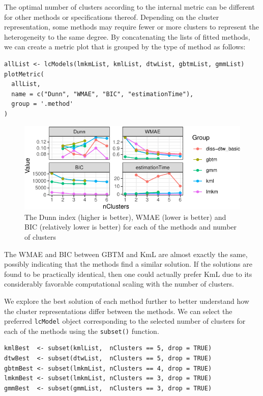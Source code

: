 The optimal number of clusters according to the internal metric can be different for other methods or specifications thereof. Depending on the cluster representation, some methods may require fewer or more clusters to represent the heterogeneity to the same degree. By concatenating the lists of fitted methods, we can create a metric plot that is grouped by the type of method as follows:

\begin{verbatim}
allList <- lcModels(lmkmList, kmlList, dtwList, gbtmList, gmmList)
plotMetric(
  allList,
  name = c("Dunn", "WMAE", "BIC", "estimationTime"),
  group = '.method'
)
\end{verbatim}

\begin{figure}

{\centering \includegraphics{figures/numclus-1} 

}

\caption{The Dunn index (higher is better), WMAE (lower is better) and BIC (relatively lower is better) for each of the methods and number of clusters}\label{fig:numclus}
\end{figure}

The WMAE and BIC between GBTM and KmL are almost exactly the same, possibly indicating that the methods find a similar solution. If the solutions are found to be practically identical, then one could actually prefer KmL due to its considerably favorable computational scaling with the number of clusters.

We explore the best solution of each method further to better understand how the cluster representations differ between the methods. We can select the preferred \texttt{lcModel} object corresponding to the selected number of clusters for each of the methods using the \texttt{subset()} function.

\begin{verbatim}
kmlBest  <- subset(kmlList,  nClusters == 5, drop = TRUE)
dtwBest  <- subset(dtwList,  nClusters == 5, drop = TRUE)
gbtmBest <- subset(lmkmList, nClusters == 4, drop = TRUE)
lmkmBest <- subset(lmkmList, nClusters == 3, drop = TRUE)
gmmBest  <- subset(gmmList,  nClusters == 3, drop = TRUE)
\end{verbatim}

